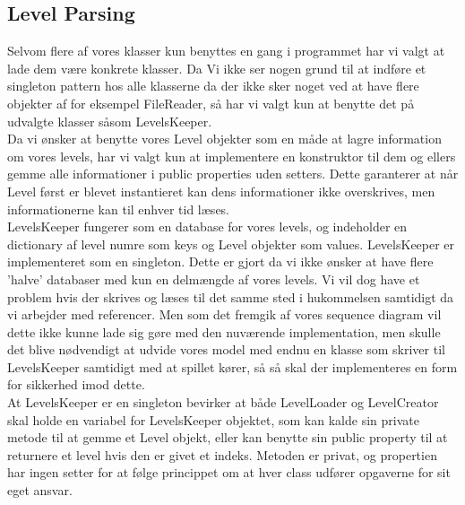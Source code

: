 \subsection{Level Parsing}
Selvom flere af vores klasser kun benyttes en gang i programmet har vi valgt at lade dem være konkrete klasser. Da Vi ikke ser nogen grund til at indføre et singleton pattern hos alle klasserne da der ikke sker noget ved at have flere objekter af for eksempel FileReader, så har vi valgt kun at benytte det på udvalgte klasser såsom LevelsKeeper.\\
Da vi ønsker at benytte vores Level objekter som en måde at lagre information om vores levels, har vi valgt kun at implementere en konstruktor til dem og ellers gemme alle informationer i public properties uden setters. Dette garanterer at når Level først er blevet instantieret kan dens informationer ikke overskrives, men informationerne kan til enhver tid læses.\\
LevelsKeeper fungerer som en database for vores levels, og indeholder en dictionary af level numre som keys og Level objekter som values. LevelsKeeper er implementeret som en singleton. Dette er gjort da vi ikke ønsker at have flere 'halve' databaser med kun en delmængde af vores levels. Vi vil dog have et problem hvis der skrives og læses til det samme sted i hukommelsen samtidigt da vi arbejder med referencer. Men som det fremgik af vores sequence diagram vil dette ikke kunne lade sig gøre med den nuværende implementation, men skulle det blive nødvendigt at udvide vores model med endnu en klasse som skriver til LevelsKeeper samtidigt med at spillet kører, så så skal der implementeres en form for sikkerhed imod dette.\\
At LevelsKeeper er en singleton bevirker at både LevelLoader og LevelCreator skal holde en variabel for LevelsKeeper objektet, som kan kalde sin private metode til at gemme et Level objekt, eller kan benytte sin public property til at returnere et level hvis den er givet et indeks. Metoden er privat, og propertien har ingen setter for at følge princippet om at hver class udfører opgaverne for sit eget ansvar.

